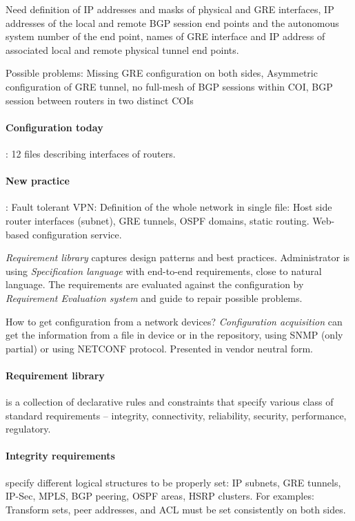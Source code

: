 \documentclass[a4paper, 11pt]{report}
\begin{document}
Need definition of IP addresses and masks of physical and GRE interfaces, IP addresses of the local and remote BGP session end points and the autonomous system number of the end point, names of GRE  interface and IP address of associated local and remote physical tunnel end points.

Possible problems: Missing GRE configuration on both sides, Asymmetric configuration of GRE tunnel, no full-mesh of BGP sessions within COI, BGP session between routers in two distinct COIs

\paragraph{Configuration today}: 12 files describing interfaces of routers.
\paragraph{New practice}: Fault tolerant VPN: Definition of the whole network in single file: Host side router interfaces (subnet), GRE tunnels, OSPF domains, static routing. Web-based configuration service.

\emph{Requirement library} captures design patterns and best practices. Administrator is using \emph{Specification language} with end-to-end requirements, close to natural language. The requirements are evaluated against the configuration by \emph{Requirement Evaluation system} and guide to repair possible problems.

How to get configuration from a network devices? \emph{Configuration acquisition} can get the information from a file in device or in the repository, using SNMP (only partial) or using NETCONF protocol. Presented in vendor neutral form.

\paragraph{Requirement library} is a collection of declarative rules and constraints that specify various class of standard requirements -- integrity, connectivity, reliability, security, performance, regulatory.

\paragraph{Integrity requirements} specify different logical structures to be properly set: IP subnets, GRE tunnels, IP-Sec, MPLS, BGP peering, OSPF areas, HSRP clusters. For examples: Transform sets, peer addresses, and ACL must be set consistently on both sides.
\end{document}
